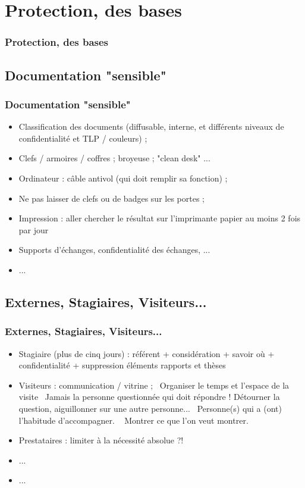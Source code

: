 \documentclass[slidetop,11pt]{beamer}
\begin{document}
\section{Protection, des bases}
\begin{frame}
	\frametitle{Protection, des bases}
	\tableofcontents[sections=3,currentsection,subsectionstyle=show/shaded/hide] %
\end{frame}

\subsection{Documentation "sensible"}
\begin{frame}
	\frametitle{Documentation "sensible"}
	\begin{itemize}
		\item Classification des documents (diffusable, interne, et diff{\'e}rents niveaux de confidentialit{\'e} et TLP / couleurs) ; 
		\item Clefs / armoires / coffres ; broyeuse ; "clean desk" ... 
		\item Ordinateur : c{\^a}ble antivol (qui doit remplir sa fonction) ; 
		\item Ne pas laisser de clefs ou de badges sur les portes ; 
		\item Impression : aller chercher le r{\'e}sultat sur l'imprimante papier au moins 2 fois par jour
		\item Supports d'{\'e}changes, confidentialit{\'e} des {\'e}changes, ... 
		\item ... 
	\end{itemize}
\end{frame}

\subsection{Externes, Stagiaires, Visiteurs... }
\begin{frame}
	\frametitle{Externes, Stagiaires, Visiteurs... }
	\begin{itemize}
		\item Stagiaire (plus de cinq jours) : r{\'e}f{\'e}rent + consid{\'e}ration + savoir o{\`u} + confidentialit{\'e} + suppression {\'e}l{\'e}ments rapports et th{\`e}ses
		\item Visiteurs : communication / vitrine ;~\newline
			Organiser le temps et l'espace de la visite~\newline
			Jamais la personne questionn{\'e}e qui doit r{\'e}pondre ! D{\'e}tourner la question, aiguillonner sur une autre personne...~\newline
			Personne(s) qui a (ont) l'habitude d'accompagner. ~\newline
			Montrer ce que l'on veut montrer. 
		\item Prestataires : limiter {\`a} la n{\'e}cessit{\'e} absolue ?!
		\item ... 
		\item ... 
	\end{itemize}
\end{frame}
\end{document}
